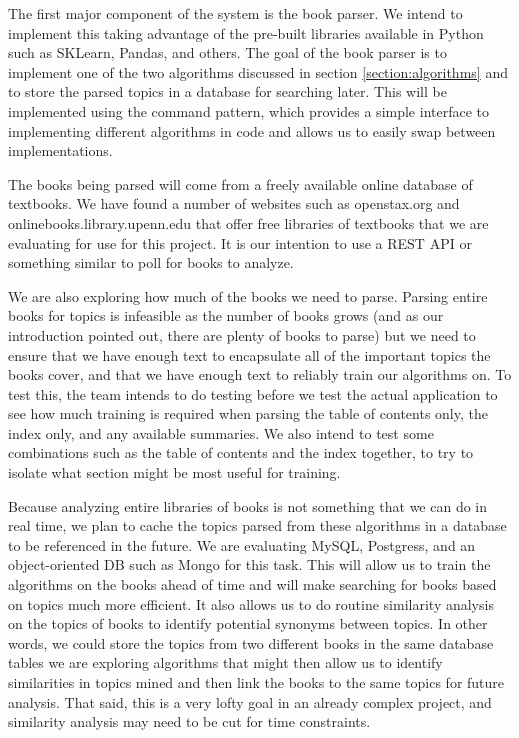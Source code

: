 
The first major component of the system is the book parser.  
We intend to implement this taking advantage of the pre-built libraries available in Python such as SKLearn, Pandas, and others.  
The goal of the book parser is to implement one of the two algorithms discussed in section \ref{section:algorithms} and to store the parsed topics in a database for searching later.  
This will be implemented using the command pattern, which provides a simple interface to implementing different algorithms in code and allows us to easily swap between implementations.



The books being parsed will come from a freely available online database of textbooks.  
We have found a number of websites such as openstax.org and onlinebooks.library.upenn.edu that offer free libraries of textbooks that we are evaluating for use for this project.
It is our intention to use a REST API or something similar to poll for books to analyze.

We are also exploring how much of the books we need to parse.
Parsing entire books for topics is infeasible as the number of books grows (and as our introduction pointed out, there are plenty of books to parse) but we need to ensure that we have enough text to encapsulate all of the important topics the books cover, and that we have enough text to reliably train our algorithms on.
To test this, the team intends to do testing before we test the actual application to see how much training is required when parsing the table of contents only, the index only, and any available summaries.
We also intend to test some combinations such as the table of contents and the index together, to try to isolate what section might be most useful for training.


Because analyzing entire libraries of books is not something that we can do in real time, we plan to cache the topics parsed from these algorithms in a database to be referenced in the future.  
We are evaluating MySQL, Postgress, and an object-oriented DB such as Mongo for this task.  
This will allow us to train the algorithms on the books ahead of time and will make searching for books based on topics much more efficient. 
It also allows us to do routine similarity analysis on the topics of books to identify potential synonyms between topics.
In other words, we could store the topics from two different books in the same database tables we are exploring algorithms that might then allow us to identify similarities in topics mined and then link the books to the same topics for future analysis.  
That said, this is a very lofty goal in an already complex project, and similarity analysis may need to be cut for time constraints.